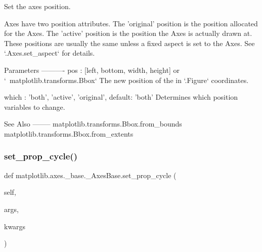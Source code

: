 \begin{DoxyVerb}Set the axes position.

Axes have two position attributes. The 'original' position is the
position allocated for the Axes. The 'active' position is the
position the Axes is actually drawn at. These positions are usually
the same unless a fixed aspect is set to the Axes. See
`.Axes.set_aspect` for details.

Parameters
----------
pos : [left, bottom, width, height] or `~matplotlib.transforms.Bbox`
    The new position of the in `.Figure` coordinates.

which : {'both', 'active', 'original'}, default: 'both'
    Determines which position variables to change.

See Also
--------
matplotlib.transforms.Bbox.from_bounds
matplotlib.transforms.Bbox.from_extents
\end{DoxyVerb}
 \mbox{\label{classmatplotlib_1_1axes_1_1__base_1_1__AxesBase_a6017bb9ef43c8fea5e1ea371b12c49f0}} 
\subsubsection{\texorpdfstring{set\+\_\+prop\+\_\+cycle()}{set\_prop\_cycle()}}
{\footnotesize\ttfamily def matplotlib.\+axes.\+\_\+base.\+\_\+\+Axes\+Base.\+set\+\_\+prop\+\_\+cycle (\begin{DoxyParamCaption}\item[{}]{self,  }\item[{}]{args,  }\item[{}]{kwargs }\end{DoxyParamCaption})}

